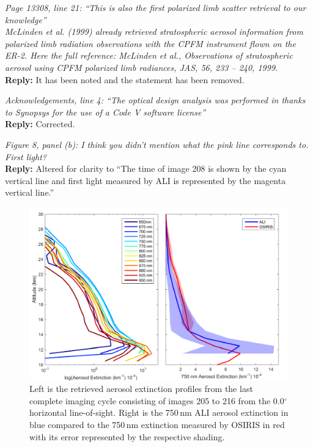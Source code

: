 \documentclass[12pt, notitlepage]{article}
\begin{document}
\hrulefill

\textit{Page 13308, line 21: ``This is also the first polarized limb scatter retrieval to our knowledge''}\\

\textit{McLinden et al. (1999) already retrieved stratospheric aerosol information from polarized
limb radiation observations with the CPFM instrument flown on the ER-2. Here
the full reference: McLinden et al., Observations of stratospheric aerosol using CPFM
polarized limb radiances, JAS, 56, 233 – 240, 1999.}\\

\textbf{Reply:} It has been noted and the statement has been removed.

\hrulefill

\textit{Acknowledgements, line 4: ``The optical design analysis was performed in thanks to Synopsys for the use of a Code V software license''}\\

\textbf{Reply:} Corrected.

\hrulefill

\textit{Figure 8, panel (b): I think you didn't mention what the pink line corresponds to. First
light?}\\

\textbf{Reply:} Altered for clarity to ``The time of image 208 is shown by the
  cyan vertical line and first light measured by ALI is represented by the
  magenta vertical line.''

\hrulefill

\begin{figure}
\includegraphics[width=120mm]{amt-2015-329-discussions-f12.pdf}
\caption{Left is the retrieved aerosol extinction profiles from the
  last complete imaging cycle consisting of images 205 to 216 from the
  0.0$^{\circ}$ horizontal line-of-sight. Right is the 750\,nm
  ALI aerosol extinction in blue compared to the 750\,nm extinction measured by OSIRIS
  in red with its error represented by the respective
  shading.}
\label{amtd-2015-0329-f12.pdf}
\end{figure}
\end{document}

